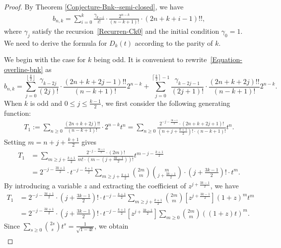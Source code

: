\documentclass[reqno, 12pt]{article}
\theoremstyle{mydefinition}
\theoremstyle{myremark}
\numberwithin{algorithm}{section}
\begin{document}
\begin{proof}
By Theorem \ref{Conjecture-Bnk--semi-closed}, we have
\begin{align}\label{Equation-overline-bnk}
b_{n,k}=\sum_{i=0}^k \frac{\gamma_{k-i}}{i!}\cdot \frac{2^{n-k}}{(n-k+1)!}\cdot (2n+k+i-1)!!,
\end{align}
where $\gamma_{j}$ satisfy the recursion~\eqref{Recurren-Ck0} and the initial condition $\gamma_{0}=1$. We need to derive the formula for $D_k(t)$ according to the parity of $k$.

We begin with the case for $k$ being odd.
It is convenient to rewrite~\eqref{Equation-overline-bnk} as
\begin{equation}\label{eq:T12}
b_{n,k}=\sum_{j=0}^{\left\lfloor\frac{k}{2}\right\rfloor} \frac{\gamma_{k-2j}}{(2j)!}\cdot \frac{(2n+k+2j-1)!!}{(n-k+1)!} 2^{n-k}
+\sum_{j=0}^{\left\lceil\frac{k}{2} \right\rceil-1} \frac{\gamma_{k-2j-1}}{(2j+1)!}\cdot \frac{(2n+k+2j)!!}{(n-k+1)!} 2^{n-k}.
\end{equation}
When $k$ is odd and $0\leq j\leq \frac{k-1}{2}$, we first consider the following generating function:
\begin{align*}
T_1:=\sum_{n\geq 0} \frac{(2n+k+2j)!!}{(n-k+1)!}\cdot 2^{n-k} t^n =\sum_{n\geq 0} \frac{2^{-j-\frac{3k+1}{2}}\cdot (2n+k+2j+1)!}{(n+j+\frac{k+1}{2})!\cdot (n-k+1)!} t^n.
\end{align*}
Setting $m=n+j+\frac{k+1}{2}$ gives
\begin{align*}
T_1&=\sum_{m\geq j+\frac{k+1}{2}} \frac{2^{-j-\frac{3k+1}{2}}\cdot (2m)!}{m!\cdot (m-(j+\frac{3k-1}{2}))!} t^{m-j-\frac{k+1}{2}}
\\& =2^{-j-\frac{3k+1}{2}}\cdot t^{-j-\frac{k+1}{2}} \sum_{m\geq j+\frac{k+1}{2}} \binom{2m}{m} \binom{m}{j+\frac{3k-1}{2}} \cdot \left(j+\frac{3k-1}{2}\right)!\cdot t^m.
\end{align*}
By introducing  a variable $z$ and extracting the coefficient of $z^{j+\frac{3k-1}{2}}$, we have
\begin{align*}
T_1 &=2^{-j-\frac{3k+1}{2}}\cdot \left(j+\frac{3k-1}{2}\right)! \cdot t^{-j-\frac{k+1}{2}}
\sum_{m\geq j+\frac{k+1}{2}} \binom{2m}{m} [z^{j+\frac{3k-1}{2}}] (1+z)^mt^m
\\ &= 2^{-j-\frac{3k+1}{2}}\cdot \left(j+\frac{3k-1}{2}\right)! \cdot t^{-j-\frac{k+1}{2}}[z^{j+\frac{3k-1}{2}}]
\sum_{m\geq 0} \binom{2m}{m}((1+z)t)^m.
\end{align*}
Since $\sum_{s\geq 0}\binom{2s}{s}t^s=\frac{1}{\sqrt{1-4t}}$, we obtain
\begin{align*}

\end{align*}
\end{proof}
\end{document}
